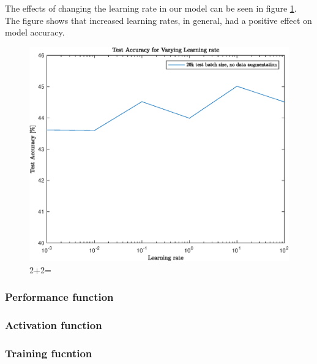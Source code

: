 The effects of changing the learning rate in our model can be seen in figure \ref{fig:learningRate}. The figure shows that increased learning rates, in general, had a positive effect on model accuracy.


\begin{figure}[h!]
    \centering
    \includegraphics{images/learningRate.eps}
    \caption{2+2=}
    \label{fig:learningRate}
 \end{figure}

 \subsubsection{Performance function}

 \subsubsection{Activation function}

 \subsubsection{Training fucntion}
